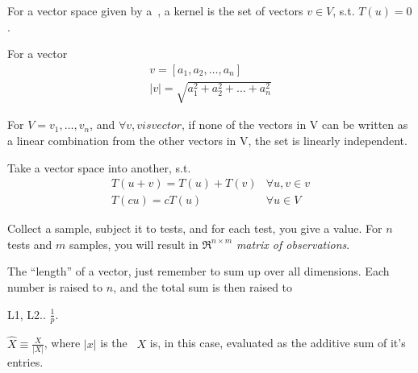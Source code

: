 \begin{definition}[Kernel]
    For a vector space given by a~, a kernel is the set
    of vectors $v \in V$, s.t. $T(u) = 0$.
\end{definition}

\begin{definition}\label{vectorlength}
    For a vector 
    \begin{align*}
        v = [a_{1}, a_{2}, \dots , a_{n}] \\
        |v| = \sqrt{a^{2}_{1} + a^{2}_{2} + \dots + a^{2}_{n}}{}
    \end{align*}
\end{definition}

\begin{definition}
    For $V = {v_{1}, \dots, v_{n}}$, and $\forall v, v is vector$,
    if none of the vectors in V can be written as a linear combination
    from the other vectors in V, the set is linearly independent.
\end{definition}

\begin{definition}\label{lintrans}
    Take a vector space into another, s.t.\
    \begin{align}
        T(u + v) = T(u) + T(v) &\forall u,v \in v \\
        T(cu) = cT(u) &\forall u \in V
    \end{align}
\end{definition}

\begin{definition}
    Collect a sample, subject it to tests, and for each test, you give a value.
    For $n$ tests and $m$ samples, you will result in $\Re^{n\times{m}}$ 
    \textit{matrix of observations}.
\end{definition}

\begin{definition}[Norm]
    The ``length'' of a vector, just remember to sum up over all dimensions.
    Each number is raised to $n$, and the total sum is then raised to

    L1, L2..
$\frac{1}{p}$.  \end{definition}

\begin{definition}
    $ \hat{X} \equiv \frac{X}{|X|} $, where $|x|$ is the~
    $X$ is, in this case, evaluated as the additive sum of it's entries.
\end{definition}

